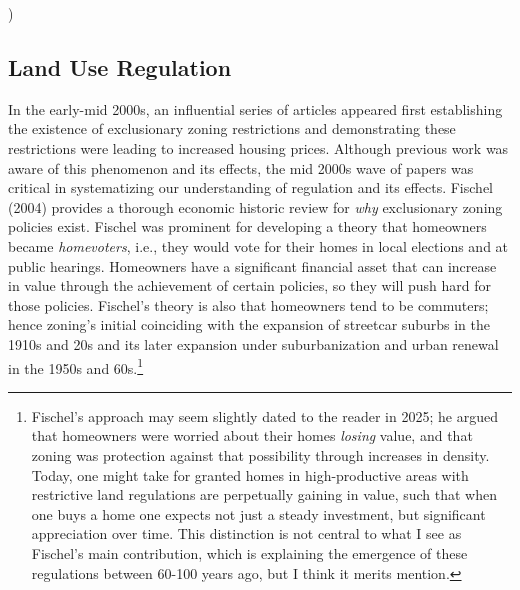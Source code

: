 )\documentclass{article}[11pt]
\begin{document}
	\subsection{Land Use Regulation}
In the early-mid 2000s, an influential series of articles appeared first establishing the existence of exclusionary zoning restrictions and demonstrating these restrictions were leading to increased housing prices. Although previous work was aware of this phenomenon and its effects, the mid 2000s wave of papers was critical in systematizing our understanding of regulation and its effects. Fischel (2004) provides a thorough economic historic review for \textit{why} exclusionary zoning policies exist. \citep{fischel2004economic} Fischel was prominent for developing a theory that homeowners became \textit{homevoters}, i.e., they would vote for their homes in local elections and at public hearings. Homeowners have a significant financial asset that can increase in value through the achievement of certain policies, so they will push hard for those policies. Fischel's theory is also that homeowners tend to be commuters; hence zoning's initial coinciding with the expansion of streetcar suburbs in the 1910s and 20s and its later expansion under suburbanization and urban renewal in the 1950s and 60s.\footnote{Fischel's approach may seem slightly dated to the reader in 2025; he argued that homeowners were worried about their homes \textit{losing} value, and that zoning was protection against that possibility through increases in density. Today, one might take for granted homes in high-productive areas with restrictive land regulations are perpetually gaining in value, such that when one buys a home one expects not just a steady investment, but significant appreciation over time. This distinction is not central to what I see as Fischel's main contribution, which is explaining the emergence of these regulations between 60-100 years ago, but I think it merits mention.} 
\end{document}
